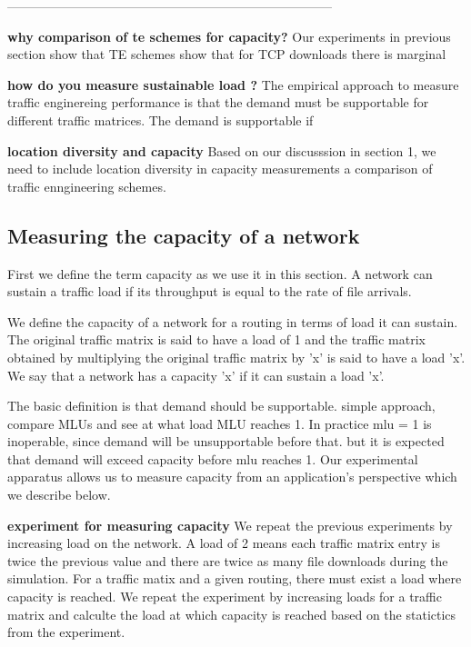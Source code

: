 -----------------------------------------------------------------------------

\textbf{why comparison of te schemes for capacity?} 
Our experiments in previous section show that TE schemes show that for TCP downloads there is marginal 




\textbf{how do you measure sustainable load ?}
The empirical approach to measure traffic enginereing performance is that the demand must be supportable for different traffic matrices. The demand is supportable if 

\textbf{location diversity and capacity} Based on our discusssion in section 1, we need to include location diversity in capacity measurements a comparison of traffic enngineering schemes.

\subsection{Measuring the capacity of a network}

First we define the term capacity as we use it in this section. A network can sustain a traffic load if its throughput is equal to the rate of file arrivals. 

We define the capacity of a network for a routing in terms of load it can sustain. The original traffic matrix is said to have a load of 1 and the traffic matrix obtained by multiplying the original traffic matrix by 'x' is said to have a load 'x'. We say that a network has a capacity 'x' if it can sustain a load 'x'.


The basic definition is that demand should be supportable. simple approach, compare MLUs and see at what load MLU reaches 1. In practice mlu = 1 is inoperable, since demand will be unsupportable before that. but it is expected that demand will exceed capacity before mlu reaches 1. Our experimental apparatus allows us to measure capacity from an application's perspective which we describe below.

\textbf{experiment for measuring capacity} 
We repeat the previous experiments by increasing load on the network. A load of 2 means each traffic matrix entry is twice the previous value and there are twice as many file downloads during the simulation. For a traffic matix and a given routing, there must exist a load where capacity is reached. We repeat the experiment by increasing loads for a traffic matrix and calculte the load at which capacity is reached based on the statictics from the experiment.

